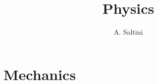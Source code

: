 \documentclass[12pt]{scrbook}
\title{Physics}
\author{A. Saltini}
\date{}
\begin{document}
\maketitle

\part{Mechanics}

\end{document}
